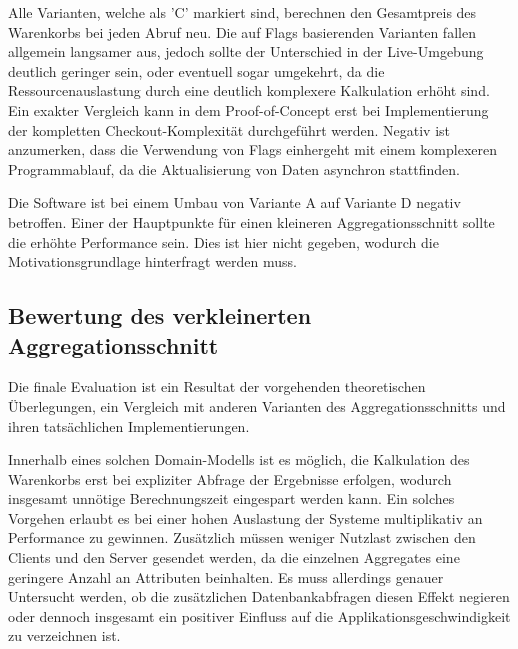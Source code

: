 Alle Varianten, welche als 'C' markiert sind, berechnen den Gesamtpreis des Warenkorbs bei jeden Abruf neu. Die auf Flags basierenden Varianten fallen allgemein langsamer aus, jedoch sollte der Unterschied in der Live-Umgebung deutlich geringer sein, oder eventuell sogar umgekehrt, da die Ressourcenauslastung durch eine deutlich komplexere Kalkulation erhöht sind. Ein exakter Vergleich kann in dem Proof-of-Concept erst bei Implementierung der kompletten Checkout-Komplexität durchgeführt werden. Negativ ist anzumerken, dass die Verwendung von Flags einhergeht mit einem komplexeren Programmablauf, da die Aktualisierung von Daten asynchron stattfinden.

Die Software ist bei einem Umbau von Variante A auf Variante D negativ betroffen. Einer der Hauptpunkte für einen kleineren Aggregationsschnitt sollte die erhöhte Performance sein. Dies ist hier nicht gegeben, wodurch die Motivationsgrundlage hinterfragt werden muss. 




\subsection{Bewertung des verkleinerten Aggregationsschnitt}

Die finale Evaluation ist ein Resultat der vorgehenden theoretischen Überlegungen, ein Vergleich mit anderen Varianten des Aggregationsschnitts und ihren tatsächlichen Implementierungen.

Innerhalb eines solchen Domain-Modells ist es möglich, die Kalkulation des Warenkorbs erst bei expliziter Abfrage der Ergebnisse erfolgen, wodurch insgesamt unnötige Berechnungszeit eingespart werden kann. Ein solches Vorgehen erlaubt es bei einer hohen Auslastung der Systeme multiplikativ an Performance zu gewinnen. Zusätzlich müssen weniger Nutzlast zwischen den Clients und den Server gesendet werden, da die einzelnen Aggregates eine geringere Anzahl an Attributen beinhalten. Es muss allerdings genauer Untersucht werden, ob die zusätzlichen Datenbankabfragen diesen Effekt negieren oder dennoch insgesamt ein positiver Einfluss auf die Applikationsgeschwindigkeit zu verzeichnen ist. 

